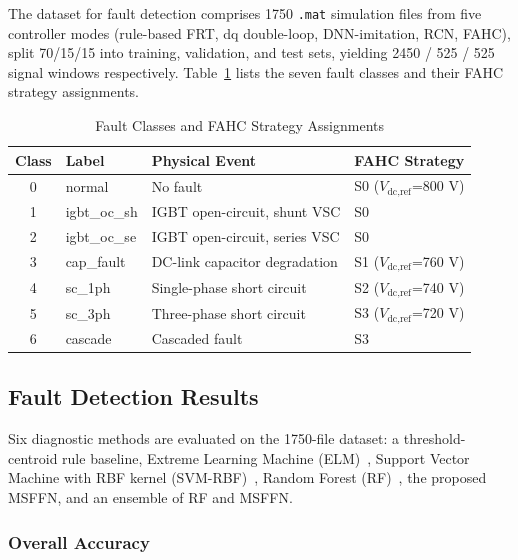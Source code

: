 The dataset for fault detection comprises 1750 \texttt{.mat}
simulation files from five controller modes
(rule-based FRT, dq double-loop, DNN-imitation, RCN, FAHC),
split 70/15/15 into training, validation, and test sets,
yielding 2450 / 525 / 525 signal windows respectively.
Table~\ref{tab:faultclasses} lists the seven fault classes
and their FAHC strategy assignments.

\begin{table}[htbp]
\caption{Fault Classes and FAHC Strategy Assignments}
\label{tab:faultclasses}
\centering
\begin{tabular}{clll}
\hline
Class & Label & Physical Event & FAHC Strategy \\
\hline
0 & normal      & No fault                          & S0 ($V_\text{dc,ref}$=800 V) \\
1 & igbt\_oc\_sh & IGBT open-circuit, shunt VSC      & S0 \\
2 & igbt\_oc\_se & IGBT open-circuit, series VSC     & S0 \\
3 & cap\_fault  & DC-link capacitor degradation      & S1 ($V_\text{dc,ref}$=760 V) \\
4 & sc\_1ph     & Single-phase short circuit         & S2 ($V_\text{dc,ref}$=740 V) \\
5 & sc\_3ph     & Three-phase short circuit          & S3 ($V_\text{dc,ref}$=720 V) \\
6 & cascade     & Cascaded fault                     & S3 \\
\hline
\end{tabular}
\end{table}

\subsection{Fault Detection Results}
\label{sec:fault-results}

Six diagnostic methods are evaluated on the 1750-file
dataset: a threshold-centroid rule baseline,
Extreme Learning Machine (ELM)~\cite{huang2006extreme},
Support Vector Machine with RBF kernel (SVM-RBF)~\cite{cortes1995svm},
Random Forest (RF)~\cite{breiman2001random},
the proposed MSFFN, and an ensemble of RF and MSFFN.

\subsubsection{Overall Accuracy}

